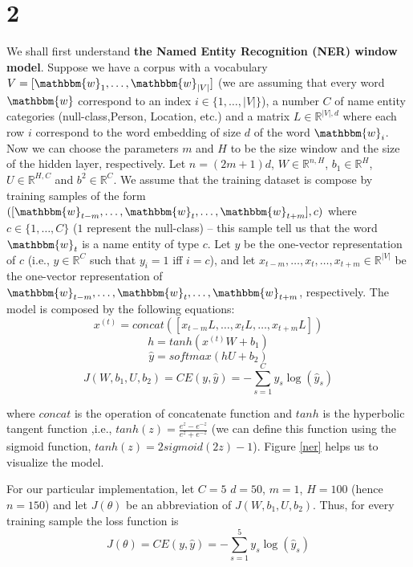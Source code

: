 \documentclass{article}
\newcommand{\wo}{\mathbbm{w}}
\begin{document}
\section{2}
We shall first understand \textbf{the Named Entity Recognition (NER) window model}. Suppose we have a corpus with a vocabulary $V =[\wo_{1}, \dots, \wo_{|V|}]$ (we are assuming that every word $\wo$ correspond to an index $i \in \{1, \dots, |V|\}$), a number $C$ of name entity categories (null-class,Person, Location, etc.) and a matrix $L \in \mathbb{R}^{|V|,d}$ where each row $i$ correspond to the word embedding of size $d$ of the word $\wo_{i}$. Now we can choose the parameters $m$ and $H$ to be the size window and the size of the hidden layer, respectively. Let $n = (2m+1)d$, $W \in \mathbb{R}^{n,H}$, $b_{1} \in \mathbb{R}^{H}$, $U \in \mathbb{R}^{H,C}$ and $b^{2} \in \mathbb{R}^{C}$. We assume that the training dataset is compose by training samples of the form $([\wo_{t-m}, \dots, \wo_{t}, \dots, \wo_{t+m}],c)$ where $c \in \{1, \dots, C\}$ ($1$ represent the null-class) -- this sample tell us that the word $ \wo_{t}$ is a name entity of type $c$. Let $y$ be the one-vector representation of $c$ (i.e., $y \in \mathbb{R}^{C}$ such that $y_{i} =1$ iff $i=c$), and let $x_{t-m}, \dots, x_{t}, \dots, x_{t+m}\in \mathbb{R}^{|V|}$ be the one-vector representation of $\wo_{t-m}, \dots, \wo_{t}, \dots, \wo_{t+m}$, respectively. The model is composed by the following equations:
\begin{equation}\label{eq:1}
x^{(t)} = concat([x_{t-m}L, \dots, x_{t}L, \dots, x_{t+m}L])
\end{equation}
 \begin{equation}\label{eq:2}
h = tanh(x^{(t)}W + b_{1})
\end{equation}
\begin{equation}\label{eq:3}
\hat{y} = softmax(hU + b_{2})
\end{equation}
\begin{equation}\label{eq:4}
J(W,b_{1},U,b_{2}) = CE(y,\hat{y}) = -\sum_{s=1}^{C} y_s  \log(\hat{y}_s)
\end{equation}

where $concat$ is the operation of concatenate function and $tanh$ is the hyperbolic tangent function ,i.e.,  $tanh(z) = \frac{e^{z} - e^{-z}}{e^{z} + e^{-z}}$ (we can define this function using the sigmoid function, $tanh(z) = 2sigmoid(2z)-1$). Figure \ref{ner} helps us to visualize the model.

For our particular implementation, let $C=5$ $d=50$, $m=1$, $H=100$ (hence $n=150$) and let $J(\theta)$ be an abbreviation of $J(W,b_{1},U,b_{2})$. Thus, for every training sample the loss function is
\begin{equation}\label{eq:5}
J(\theta) = CE(y,\hat{y}) = -\sum_{s=1}^{5} y_s  \log(\hat{y}_s)
\end{equation}
\end{document}
